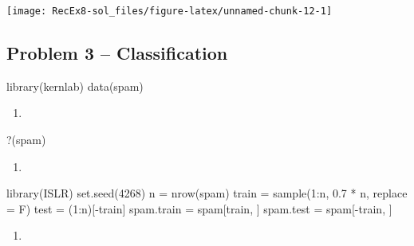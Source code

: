\documentclass[
]{article}
\newenvironment{Shaded}{\begin{snugshade}}{\end{snugshade}}
\newcommand{\AttributeTok}[1]{\textcolor[rgb]{0.77,0.63,0.00}{#1}}
\newcommand{\DecValTok}[1]{\textcolor[rgb]{0.00,0.00,0.81}{#1}}
\newcommand{\FloatTok}[1]{\textcolor[rgb]{0.00,0.00,0.81}{#1}}
\newcommand{\FunctionTok}[1]{\textcolor[rgb]{0.00,0.00,0.00}{#1}}
\newcommand{\NormalTok}[1]{#1}
\newcommand{\OtherTok}[1]{\textcolor[rgb]{0.56,0.35,0.01}{#1}}
\newcommand{\SpecialCharTok}[1]{\textcolor[rgb]{0.00,0.00,0.00}{#1}}
\newcommand{\StringTok}[1]{\textcolor[rgb]{0.31,0.60,0.02}{#1}}
\providecommand{\tightlist}{%
  \setlength{\itemsep}{0pt}\setlength{\parskip}{0pt}}
\begin{document}
\texttt{[image: RecEx8-sol\_files/figure-latex/unnamed-chunk-12-1]}

\hypertarget{problem-3-classification}{%
\subsection{Problem 3 --
Classification}\label{problem-3-classification}}

\begin{Shaded}
\begin{Highlighting}[]
\FunctionTok{library}\NormalTok{(kernlab)}
\FunctionTok{data}\NormalTok{(spam)}
\end{Highlighting}
\end{Shaded}

\begin{enumerate}
\def\labelenumi{\alph{enumi})}
\tightlist
\item
\end{enumerate}

\begin{Shaded}
\begin{Highlighting}[]
\StringTok{\textasciigrave{}}\AttributeTok{?}\StringTok{\textasciigrave{}}\NormalTok{(spam)}
\end{Highlighting}
\end{Shaded}

\begin{enumerate}
\def\labelenumi{\alph{enumi})}
\setcounter{enumi}{1}
\tightlist
\item
\end{enumerate}

\begin{Shaded}
\begin{Highlighting}[]
\FunctionTok{library}\NormalTok{(ISLR)}
\FunctionTok{set.seed}\NormalTok{(}\DecValTok{4268}\NormalTok{)}
\NormalTok{n }\OtherTok{=} \FunctionTok{nrow}\NormalTok{(spam)}
\NormalTok{train }\OtherTok{=} \FunctionTok{sample}\NormalTok{(}\DecValTok{1}\SpecialCharTok{:}\NormalTok{n, }\FloatTok{0.7} \SpecialCharTok{*}\NormalTok{ n, }\AttributeTok{replace =}\NormalTok{ F)}
\NormalTok{test }\OtherTok{=}\NormalTok{ (}\DecValTok{1}\SpecialCharTok{:}\NormalTok{n)[}\SpecialCharTok{{-}}\NormalTok{train]}
\NormalTok{spam.train }\OtherTok{=}\NormalTok{ spam[train, ]}
\NormalTok{spam.test }\OtherTok{=}\NormalTok{ spam[}\SpecialCharTok{{-}}\NormalTok{train, ]}
\end{Highlighting}
\end{Shaded}

\begin{enumerate}
\def\labelenumi{\alph{enumi})}
\setcounter{enumi}{2}
\tightlist
\item
\end{enumerate}
\end{document}
